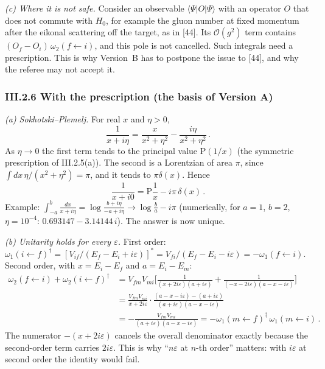 \emph{(c) Where it is not safe.} Consider an observable $\langle\Psi|O|\Psi\rangle$ with an operator $O$ that does not commute with $H_0$, for example the gluon number at fixed momentum after the eikonal scattering off the target, as in [44]. Its $\mathcal O(g^2)$ term contains $(O_f-O_i)\,\omega_2(f\!\leftarrow\! i)$, and this pole is not cancelled. Such integrals need a prescription. This is why Version~B has to postpone the issue to [44], and why the referee may not accept it.

\subsubsection*{III.2.6 With the prescription (the basis of Version A)}

\emph{(a) Sokhotski--Plemelj.} For real $x$ and $\eta>0$,
\[
\frac{1}{x+i\eta}=\frac{x}{x^2+\eta^2}-\frac{i\eta}{x^2+\eta^2}\,.
\]
As $\eta\to0$ the first term tends to the principal value $\mathrm P(1/x)$ (the symmetric prescription of III.2.5(a)). The second is a Lorentzian of area $\pi$, since $\int dx\,\eta/(x^2+\eta^2)=\pi$, and it tends to $\pi\delta(x)$. Hence
\begin{equation}
\frac{1}{x+i0}=\mathrm P\frac1x-i\pi\,\delta(x)\,.
\label{III:SP}
\end{equation}
Example: $\int_{-a}^{b}\frac{dx}{x+i\eta}=\log\frac{b+i\eta}{-a+i\eta}\to\log\frac ba-i\pi$ (numerically, for $a=1$, $b=2$, $\eta=10^{-4}$: $0.693147-3.14144\,i$). The answer is now unique.

\emph{(b) Unitarity holds for every $\varepsilon$.} First order: $\omega_1(i\!\leftarrow\! f)^\dagger=[V_{if}/(E_f-E_i+i\varepsilon)]^*=V_{fi}/(E_f-E_i-i\varepsilon)=-\omega_1(f\!\leftarrow\! i)$. Second order, with $x=E_i-E_f$ and $a=E_i-E_m$:
\begin{align*}
\omega_2(f\!\leftarrow\! i)+\omega_2(i\!\leftarrow\! f)^\dagger
&=V_{fm}V_{mi}\Big[\frac{1}{(x+2i\varepsilon)(a+i\varepsilon)}+\frac{1}{(-x-2i\varepsilon)(a-x-i\varepsilon)}\Big]\\
&=\frac{V_{fm}V_{mi}}{x+2i\varepsilon}\cdot\frac{(a-x-i\varepsilon)-(a+i\varepsilon)}{(a+i\varepsilon)(a-x-i\varepsilon)}\\
&=-\frac{V_{fm}V_{mi}}{(a+i\varepsilon)(a-x-i\varepsilon)}=-\omega_1(m\!\leftarrow\! f)^\dagger\,\omega_1(m\!\leftarrow\! i)\,.
\end{align*}
The numerator $-(x+2i\varepsilon)$ cancels the overall denominator exactly because the second-order term carries $2i\varepsilon$. This is why ``$n\varepsilon$ at $n$-th order'' matters: with $i\varepsilon$ at second order the identity would fail.

